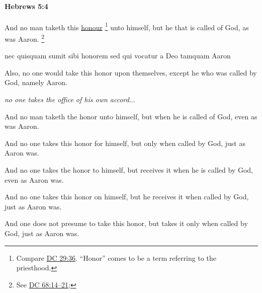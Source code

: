 		\paragraph{Hebrews 5:4} %
			\label{HEBREWS-5-4}

			And no man taketh this \hyperref[HONOR]{honour}%
				\footnote{%
					Compare \hyperref[DC29-36]{DC 29:36}. ``Honor'' comes to be a term referring to the priesthood.
					}
			unto himself, but he that is called of God, as was Aaron.%
				\footnote{%
					See \hyperref[DC68-14]{DC 68:14--21}; 
					} 

			\begin{framed}
				\scriptsize
				\begin{compactdesc}
					\item[SBLG]  \hyperref[TIME]{}
					\item[BSV] nec quisquam sumit sibi honorem sed qui vocatur a Deo tamquam Aaron
					\item[SPNT] Also, no one would take this honor upon themselves, except he who was called by God, namely Aaron.
					\item[{\hyperref[TIME]{BDAG}}] \textit{no one takes the office of his own accord}...
					\item[ASV] And no man taketh the honor unto himself, but when he is called of God, even as was Aaron.
					\item[ESV] And no one takes this honor for himself, but only when called by God, just as Aaron was.
					\item[NASB] And no one takes the honor to himself, but receives it when he is called by God, even as Aaron was.
					\item[NIV] And no one takes this honor on himself, but he receives it when called by God, just as Aaron was.
					\item[NRSV] And one does not presume to take this honor, but takes it only when called by God, just as Aaron was.
				\end{compactdesc}
			\end{framed}

